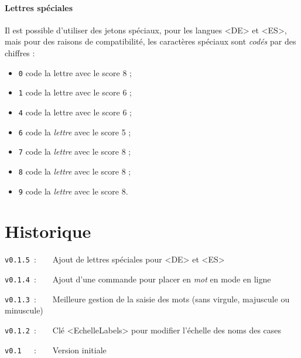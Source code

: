 \documentclass{article}
\begin{document}
\newpage

\subsection{Lettres spéciales}

Il est possible d'utiliser des jetons spéciaux, pour les langues \textsf{<DE>} et \textsf{<ES>}, mais pour des raisons de compatibilité, les caractères spéciaux sont \textit{codés} par des chiffres :

\begin{itemize}
	\item \texttt{0} code la lettre  avec le score 8 ;
	\item \texttt{1} code la lettre  avec le score 6 ;
	\item \texttt{4} code la lettre  avec le score 6 ;
	\item \texttt{6} code la \textit{lettre}  avec le score 5 ;
	\item \texttt{7} code la \textit{lettre}  avec le score 8 ;
	\item \texttt{8} code la \textit{lettre}  avec le score 8 ;
	\item \texttt{9} code la \textit{lettre}  avec le score 8.
\end{itemize}

\begin{PresentationCode}{}
{\Huge {}}

{\Huge {}}
\end{PresentationCode}

\newpage

\part*{Historique}

\verb|v0.1.5|~:~~~~Ajout de lettres spéciales pour \textsf{<DE>} et \textsf{<ES>}

\verb|v0.1.4|~:~~~~Ajout d'une commande pour placer en \textit{mot} en mode \og en ligne \fg

\verb|v0.1.3|~:~~~~Meilleure gestion de la saisie des mots (sans virgule, majuscule ou minuscule)

\verb|v0.1.2|~:~~~~Clé \textsf{<EchelleLabels>} pour modifier l'échelle des noms des cases

\verb|v0.1  |~:~~~~Version initiale
\end{document}
